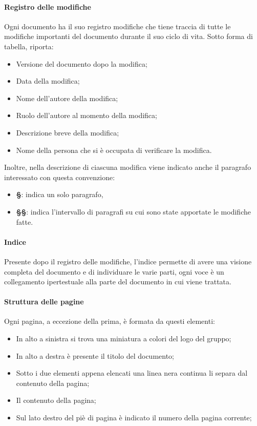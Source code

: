 \paragraph{Registro delle modifiche}
Ogni documento ha il suo registro modifiche che tiene traccia di tutte le modifiche importanti del documento durante il suo ciclo di vita.
Sotto forma di tabella, riporta:
  \begin{itemize}
  		\item Versione del documento dopo la modifica;
  		\item Data della modifica;
  		\item Nome dell’autore della modifica;
  		\item Ruolo dell’autore al momento della modifica;
  		\item Descrizione breve della modifica;
  		\item Nome della persona che si è occupata di verificare la modifica.
	\end{itemize}

Inoltre, nella descrizione di ciascuna modifica viene indicato anche il paragrafo interessato con questa convenzione: 
\begin{itemize}
    \item \textbf{\S{}}: indica un solo paragrafo,
    \item \textbf{\S{}\S{}}: indica l'intervallo di paragrafi su cui sono state apportate le modifiche fatte.
\end{itemize}

\paragraph{Indice}
Presente dopo il registro delle modifiche, l’indice permette di avere una visione completa del documento e di individuare le varie parti, ogni voce è un collegamento ipertestuale alla parte del documento in cui viene trattata.

\paragraph{Struttura delle pagine}
Ogni pagina, a eccezione della prima, è formata da questi elementi:
  \begin{itemize}
  		\item In alto a sinistra si trova una miniatura a colori del logo del gruppo;
  		\item In alto a destra è presente il titolo del documento;
  		\item Sotto i due elementi appena elencati una linea nera continua li separa dal contenuto della pagina;
  		\item Il contenuto della pagina;
  		\item Sul lato destro del piè di pagina è indicato il numero della pagina corrente;
	\end{itemize}
	
